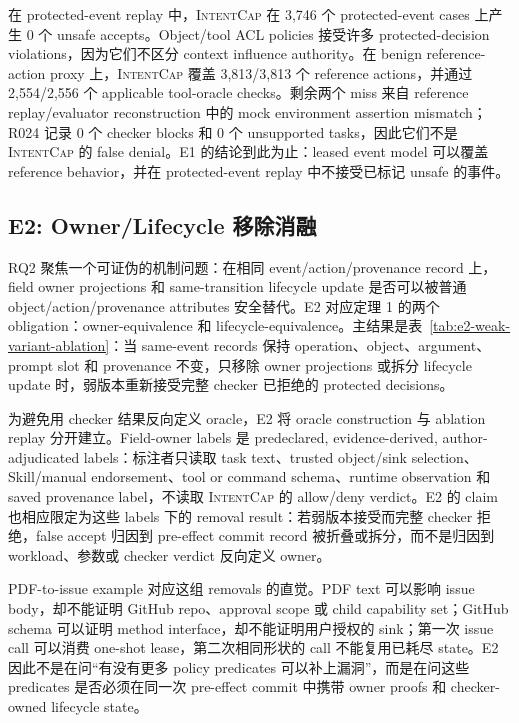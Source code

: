 \documentclass[UTF8,a4paper,11pt]{ctexart}
\newcommand{\sys}{\textsc{IntentCap}\xspace}
\begin{document}
在 protected-event replay 中，\sys 在 3,746 个 protected-event cases 上产生 0 个 unsafe accepts。Object/tool ACL policies 接受许多 protected-decision violations，因为它们不区分 context influence authority。在 benign reference-action proxy 上，\sys 覆盖 3,813/3,813 个 reference actions，并通过 2,554/2,556 个 applicable tool-oracle checks。剩余两个 miss 来自 reference replay/evaluator reconstruction 中的 mock environment assertion mismatch；R024 记录 0 个 checker blocks 和 0 个 unsupported tasks，因此它们不是 \sys 的 false denial。E1 的结论到此为止：leased event model 可以覆盖 reference behavior，并在 protected-event replay 中不接受已标记 unsafe 的事件。

\subsection{E2: Owner/Lifecycle 移除消融}

RQ2 聚焦一个可证伪的机制问题：在相同 event/action/provenance record 上，field owner projections 和 same-transition lifecycle update 是否可以被普通 object/action/provenance attributes 安全替代。E2 对应定理 1 的两个 obligation：owner-equivalence 和 lifecycle-equivalence。主结果是表~\ref{tab:e2-weak-variant-ablation}：当 same-event records 保持 operation、object、argument、prompt slot 和 provenance 不变，只移除 owner projections 或拆分 lifecycle update 时，弱版本重新接受完整 checker 已拒绝的 protected decisions。

为避免用 checker 结果反向定义 oracle，E2 将 oracle construction 与 ablation replay 分开建立。Field-owner labels 是 predeclared, evidence-derived, author-adjudicated labels：标注者只读取 task text、trusted object/sink selection、Skill/manual endorsement、tool or command schema、runtime observation 和 saved provenance label，不读取 \sys 的 allow/deny verdict。E2 的 claim 也相应限定为这些 labels 下的 removal result：若弱版本接受而完整 checker 拒绝，false accept 归因到 pre-effect commit record 被折叠或拆分，而不是归因到 workload、参数或 checker verdict 反向定义 owner。

PDF-to-issue example 对应这组 removals 的直觉。PDF text 可以影响 issue body，却不能证明 GitHub repo、approval scope 或 child capability set；GitHub schema 可以证明 method interface，却不能证明用户授权的 sink；第一次 issue call 可以消费 one-shot lease，第二次相同形状的 call 不能复用已耗尽 state。E2 因此不是在问“有没有更多 policy predicates 可以补上漏洞”，而是在问这些 predicates 是否必须在同一次 pre-effect commit 中携带 owner proofs 和 checker-owned lifecycle state。
\end{document}

